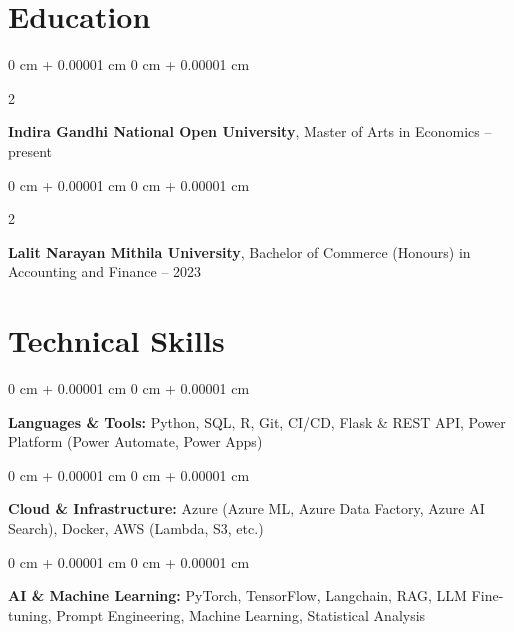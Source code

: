 \documentclass[10pt, letterpaper]{article}
\newenvironment{onecolentry}{
    \begin{adjustwidth}{
        0 cm + 0.00001 cm
    }{
        0 cm + 0.00001 cm
    }
}{
    \end{adjustwidth}
} %
\newenvironment{twocolentry}[2][]{
    \onecolentry
    \def\secondColumn{#2}
    \setcolumnwidth{\fill, 4.2 cm}
    \begin{paracol}{2}
}{
    \switchcolumn \raggedleft \secondColumn
    \end{paracol}
    \endonecolentry
} %
\begin{document}
    
    \section{Education}



        
        \begin{twocolentry}{
            2024 – present
        }
            \textbf{Indira Gandhi National Open University}, Master of Arts in Economics\end{twocolentry}



        \vspace{0.15 cm}

        \begin{twocolentry}{
            2020 – 2023
        }
            \textbf{Lalit Narayan Mithila University}, Bachelor of Commerce (Honours) in Accounting and Finance\end{twocolentry}




    
    \section{Technical Skills}



        
        \begin{onecolentry}
            \textbf{Languages \& Tools:} Python, SQL, R, Git, CI/CD, Flask \& REST API, Power Platform (Power Automate, Power Apps)
        \end{onecolentry}

        \vspace{0.15 cm}

        \begin{onecolentry}
            \textbf{Cloud \& Infrastructure:} Azure (Azure ML, Azure Data Factory, Azure AI Search), Docker, AWS (Lambda, S3, etc.)
        \end{onecolentry}

        \vspace{0.15 cm}

        \begin{onecolentry}
            \textbf{AI \& Machine Learning:} PyTorch, TensorFlow, Langchain, RAG, LLM Fine-tuning, Prompt Engineering, Machine Learning, Statistical Analysis
        \end{onecolentry}

        \vspace{0.15 cm}
\end{document}
